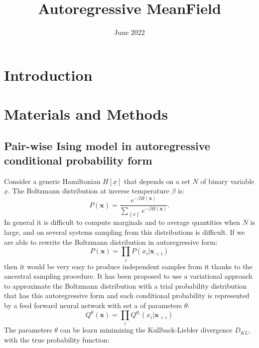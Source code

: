 \documentclass{article}
\title{Autoregressive MeanField}
\date{June 2022}
\begin{document}
\maketitle

\tableofcontents

\section{Introduction}

\section{Materials and Methods}
\subsection{Pair-wise Ising model in autoregressive conditional probability form}
Consider a generic Hamiltonian $H[\underline{x}]$ that depends on a set $N$ of binary variable $\underline{x}$. The Boltzmann distribution at inverse temperature $\beta$ is:
\begin{equation}
P\left(\mathbf{x}\right)=\frac{e^{-\beta H\left(\mathbf{x}\right)}}{\sum_{\left\{ x\right\} }e^{-\beta H\left(\mathbf{x}\right)}}.
\end{equation}
In general it is difficult to compute marginals and to average quantities when $N$ is large, and on several systems sampling from this distributions is difficult. If we are able to rewrite the Boltzmann distribution in autoregressive form:
\begin{equation}
P\left(\mathbf{x}\right)=\prod_{i}P\left(x_{i}|\mathbf{x}_{<i}\right)
\end{equation}
then it would be very easy to produce independent samples from it thanks to the ancestral sampling procedure. It has been proposed to use a variational approach to approximate the Boltzmann distribution with a trial probability distribution that has this autoregressive form and each conditional probability is represented by a feed forward neural network with set a of parameters ${\theta}$:
\begin{equation}
Q^{\theta}\left(\mathbf{x}\right)=\prod_{i}Q^{\theta_i}\left(x_{i}|\mathbf{x}_{<i}\right)
\end{equation}
The parameters ${\theta}$ can be learn minimizing the Kullback-Liebler divergence $D_{KL}$,
with the true probability function:
\end{document}

